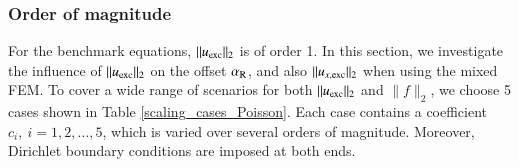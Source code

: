\documentclass[review,3p]{elsarticle}
\begin{document}


\subsubsection{Order of magnitude}	    \label{section_scaling}

For the benchmark equations, $\|u_{\rm exc}\|_2$ is of order 1. 
In this section, we investigate the influence of $\|u_{\rm exc}\|_2$ on the offset $\alpha_{\rm R}$, and also $\|u_{x,\rm exc}\|_2$ when using the mixed FEM.
To cover a wide range of scenarios for both $\|u_{\rm exc}\|_2$ and $\|f\|_2$, we choose 5 cases shown in Table \ref{scaling_cases_Poisson}. Each case contains a coefficient $c_i,~i=1,2, \ldots , 5$, which is varied over several orders of magnitude. 
Moreover, Dirichlet boundary conditions are imposed at both ends.
\end{document}

